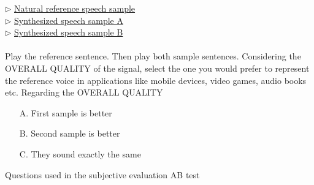 
\begin{table}[!htb]
	\begin{framed}
	$\rhd$ \underline{Natural reference speech sample}\\
	$\rhd$ \underline{Synthesized speech sample A}\\
	$\rhd$ \underline{Synthesized speech sample B}\\
	\\
	Play the reference sentence. Then play both sample sentences. Considering the OVERALL QUALITY of the signal, select the one you would prefer to represent the reference voice in applications like mobile devices, video games, audio books etc. Regarding the OVERALL QUALITY
	\begin{itemize}
	\item[A.] First sample is better
	\item[B.] Second sample is better
	\item[C.] They sound exactly the same
	\end{itemize}
	\end{framed}
\caption{Questions used in the subjective evaluation AB test}
\label{table:abtest_questions}
\end{table}

